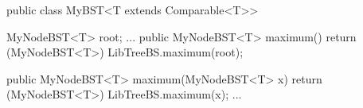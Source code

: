 public class MyBST<T extends Comparable<T>> {
	MyNodeBST<T> root;
	...
	public MyNodeBST<T> maximum() {
		return (MyNodeBST<T>) LibTreeBS.maximum(root);
	}

	public MyNodeBST<T> maximum(MyNodeBST<T> x) {
		return (MyNodeBST<T>) LibTreeBS.maximum(x);
	}
	...
}